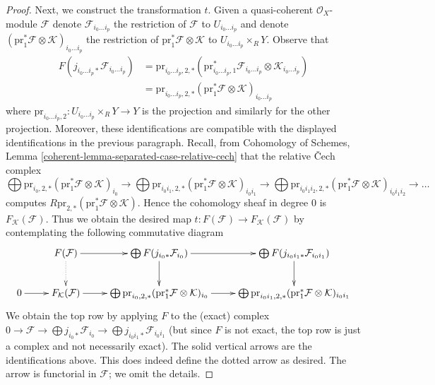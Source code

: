 \documentclass{stacks-project}
\theoremstyle{plain}
\theoremstyle{definition}
\theoremstyle{remark}
\numberwithin{equation}{subsection}
\begin{document}
\begin{proof}
\medskip\noindent
Next, we construct the transformation $t$. Given a quasi-coherent
$\mathcal{O}_X$-module $\mathcal{F}$ denote $\mathcal{F}_{i_0 \ldots i_p}$
the restriction of $\mathcal{F}$ to $U_{i_0 \ldots i_p}$ and denote
$(\text{pr}_1^*\mathcal{F} \otimes \mathcal{K})_{i_0 \ldots i_p}$
the restriction of $\text{pr}_1^*\mathcal{F} \otimes \mathcal{K}$ to
$U_{i_0 \ldots i_p} \times_R Y$.
Observe that
\begin{align*}
F(j_{i_0 \ldots i_p *}\mathcal{F}_{i_0 \ldots i_p})
& =
\text{pr}_{i_0 \ldots i_p, 2, *}(
\text{pr}_{i_0 \ldots i_p, 1}^*\mathcal{F}_{i_0 \ldots i_p}
\otimes \mathcal{K}_{i_0 \ldots i_p}) \\
& =
\text{pr}_{i_0 \ldots i_p, 2, *}
(\text{pr}_1^*\mathcal{F} \otimes \mathcal{K})_{i_0 \ldots i_p}
\end{align*}
where $\text{pr}_{i_0 \ldots i_p, 2} : U_{i_0 \ldots i_p} \times_R Y \to Y$
is the projection and similarly for the other projection. Moreover, these
identifications are compatible with the displayed identifications
in the previous paragraph. Recall, from Cohomology of Schemes, Lemma
\ref{coherent-lemma-separated-case-relative-cech}
that the relative {\v C}ech complex
$$
\bigoplus 
\text{pr}_{i_0, 2, *}
(\text{pr}_1^*\mathcal{F} \otimes \mathcal{K})_{i_0}
\to
\bigoplus 
\text{pr}_{i_0i_1, 2, *}
(\text{pr}_1^*\mathcal{F} \otimes \mathcal{K})_{i_0i_1}
\to
\bigoplus 
\text{pr}_{i_0i_1i_2, 2, *}
(\text{pr}_1^*\mathcal{F} \otimes \mathcal{K})_{i_0i_1i_2}
\to \ldots
$$
computes $R\text{pr}_{2, *}(\text{pr}_1^*\mathcal{F} \otimes \mathcal{K})$.
Hence the cohomology sheaf in degree $0$ is $F_\mathcal{K}(\mathcal{F})$.
Thus we obtain the desired map
$t : F(\mathcal{F}) \to F_\mathcal{K}(\mathcal{F})$
by contemplating the following commutative diagram
$$
\xymatrix{
&
F(\mathcal{F}) \ar[r] \ar@{..>}[d] &
\bigoplus F(j_{i_0*}\mathcal{F}_{i_0}) \ar[r] \ar[d] &
\bigoplus F(j_{i_0i_1*}\mathcal{F}_{i_0i_1}) \ar[d] \\
0 \ar[r] &
F_\mathcal{K}(\mathcal{F}) \ar[r] &
\bigoplus 
\text{pr}_{i_0, 2, *}
(\text{pr}_1^*\mathcal{F} \otimes \mathcal{K})_{i_0}
\ar[r] &
\bigoplus 
\text{pr}_{i_0i_1, 2, *}
(\text{pr}_1^*\mathcal{F} \otimes \mathcal{K})_{i_0i_1}
}
$$
We obtain the top row by applying $F$ to the (exact) complex
$0 \to \mathcal{F} \to \bigoplus j_{i_0*}\mathcal{F}_{i_0} \to
\bigoplus j_{i_0i_1*}\mathcal{F}_{i_0i_1}$ (but since
$F$ is not exact, the top row is just a complex and not
necessarily exact).
The solid vertical arrows are the identifications above.
This does indeed define the dotted arrow as desired.
The arrow is functorial in $\mathcal{F}$; we omit the details.


\end{proof}
\end{document}
